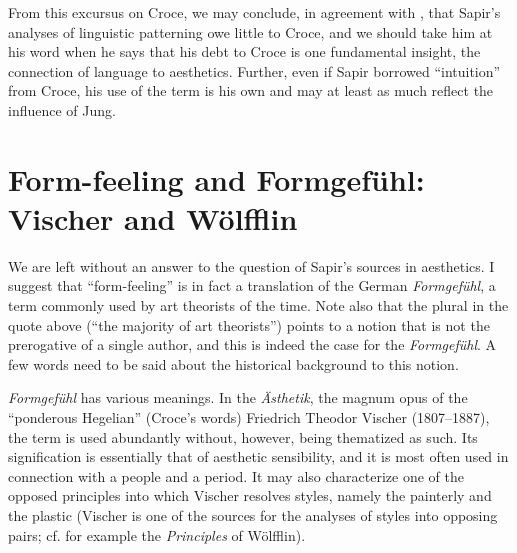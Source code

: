 \documentclass[output=paper]{langscibook}
\begin{document}
From this excursus on Croce, we may conclude, in agreement with \citet[441]{Handler1986}, that Sapir's analyses of linguistic patterning owe little to Croce, and we should take him at his word when he says that his debt to Croce is one fundamental insight, the connection of language to aesthetics. Further, even if Sapir borrowed ``intuition'' from Croce, his use of the term is his own and may at least as much reflect the influence of Jung.

\section{Form-feeling and Formgefühl: Vischer and Wölfflin}
\label{sec:fortis:vischerwoelfflin}

We are left without an answer to the question of Sapir's sources in aesthetics. I suggest that ``form-feeling'' is in fact a translation of the German \emph{Formgefühl}, a term commonly used by art theorists of the time. Note also that the plural in the quote above (``the majority of art theorists'') points to a notion that is not the prerogative of a single author, and this is indeed the case for the \emph{Formgefühl}. A few words need to be said about the historical background to this notion.

\emph{Formgefühl} has various meanings. In the \emph{Ästhetik}, the magnum opus of the ``ponderous Hegelian'' (Croce's words) Friedrich Theodor Vischer (1807--1887), the term is used abundantly without, however, being thematized as such. Its signification is essentially that of aesthetic sensibility, and it is most often used in connection with a people and a period. It may also characterize one of the opposed principles into which Vischer resolves styles, namely the painterly and the plastic (Vischer is one of the sources for the analyses of styles into opposing pairs; cf. for example the \emph{Principles} of Wölfflin).
\end{document}
